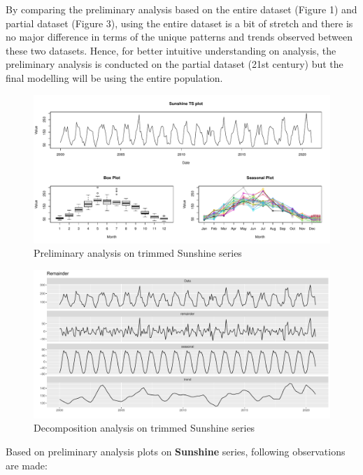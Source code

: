 \documentclass[
  11pt,
]{article}
\begin{document}
By comparing the preliminary analysis based on the entire dataset
(Figure 1) and partial dataset (Figure 3), using the entire dataset is a
bit of stretch and there is no major difference in terms of the unique
patterns and trends observed between these two datasets. Hence, for
better intuitive understanding on analysis, the preliminary analysis is
conducted on the partial dataset (21st century) but the final modelling
will be using the entire population.

\newpage

\begin{figure}
\centering
\includegraphics{ST422_files/figure-latex/unnamed-chunk-6-1.pdf}
\caption{Preliminary analysis on trimmed Sunshine series}
\end{figure}

\begin{figure}
\centering
\includegraphics{ST422_files/figure-latex/unnamed-chunk-7-1.pdf}
\caption{Decomposition analysis on trimmed Sunshine series}
\end{figure}

\newpage

Based on preliminary analysis plots on \textbf{Sunshine} series,
following observations are made:
\end{document}
